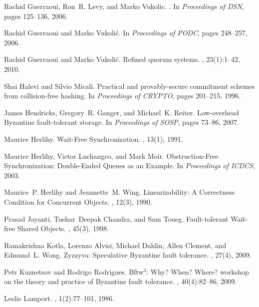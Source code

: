 \documentclass[10pt,conference,compsocconf]{IEEEtran}
\begin{document}
\begin{thebibliography}{10}
Rachid Guerraoui, Ron~R. Levy, and Marko Vukolic.
.
\newblock In {\em Proceedings of DSN}, pages 125--136, 2006.

Rachid Guerraoui and Marko Vukoli\'{c}.
\newblock In {\em Proceedings of PODC}, pages 248--257, 2006.

Rachid Guerraoui and Marko Vukoli\'c.
\newblock Refined quorum systems.
, 23(1):1--42, 2010.

Shai Halevi and Silvio Micali.
\newblock Practical and provably-secure commitment schemes from collision-free
  hashing.
\newblock In {\em Proceedings of CRYPTO}, pages 201--215, 1996.

James Hendricks, Gregory~R. Ganger, and Michael~K. Reiter.
\newblock Low-overhead {B}yzantine fault-tolerant storage.
\newblock In {\em Proceedings of SOSP}, pages 73--86, 2007.

Maurice Herlihy.
\newblock Wait-{F}ree {S}ynchronization.
, 13(1), 1991.

Maurice Herlihy, Victor Luchangco, and Mark Moir.
\newblock Obstruction-{F}ree {S}ynchronization: {D}ouble-{E}nded {Q}ueues as an
  {E}xample.
\newblock In {\em Proceedings of ICDCS}, 2003.

Maurice~P. Herlihy and Jeannette~M. Wing.
\newblock Linearizability: {A} {C}orrectness {C}ondition for {C}oncurrent
  {O}bjects.
, 12(3), 1990.

Prasad Jayanti, Tushar~Deepak Chandra, and Sam Toueg.
\newblock Fault-tolerant {W}ait-free {S}hared {O}bjects.
, 45(3), 1998.

Ramakrishna Kotla, Lorenzo Alvisi, Michael Dahlin, Allen Clement, and Edmund~L.
  Wong.
\newblock Zyzzyva: Speculative {B}yzantine fault tolerance.
, 27(4), 2009.

Petr Kuznetsov and Rodrigo Rodrigues.
\newblock Bftw$^{\mbox{3}}$: {W}hy? {W}hen? {W}here? workshop on the theory and
  practice of {B}yzantine fault tolerance.
, 40(4):82--86, 2009.

Leslie Lamport.
, 1(2):77--101, 1986.


\end{thebibliography}
\end{document}
